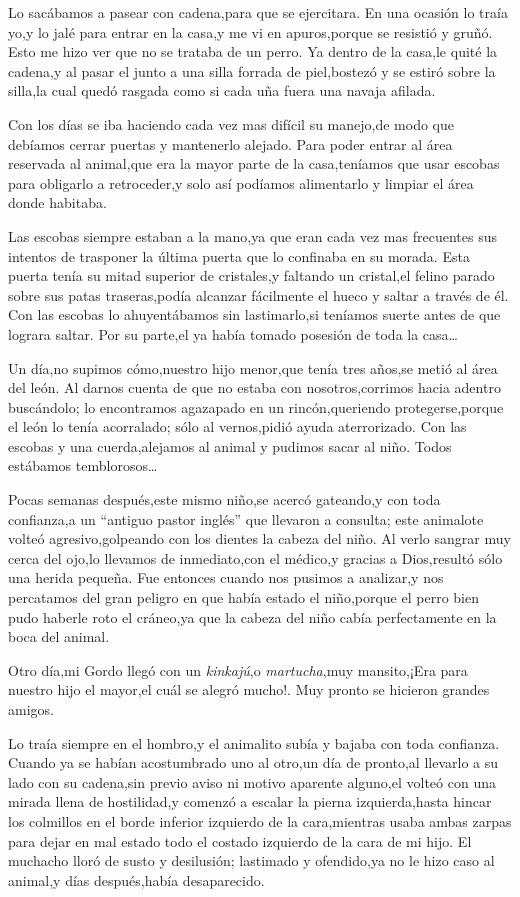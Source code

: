 \documentclass[letterpaper,12pt]{book}
\begin{document}
Lo sacábamos a pasear con cadena,para que se ejercitara. En una ocasión lo traía yo,y lo jalé para entrar en la casa,y me vi en apuros,porque se resistió y gruñó. Esto me hizo ver que no se trataba de un perro. Ya dentro de la casa,le quité la cadena,y al pasar el junto a una silla forrada de piel,bostezó y se estiró sobre la silla,la cual quedó rasgada como si cada uña fuera una navaja afilada.

Con los días se iba haciendo cada vez mas difícil su manejo,de modo que debíamos cerrar puertas y mantenerlo alejado. Para poder entrar al área reservada al animal,que era la mayor parte de la casa,teníamos que usar escobas para obligarlo a retroceder,y solo así podíamos alimentarlo y limpiar el área donde habitaba.

Las escobas siempre estaban a la mano,ya que eran cada vez mas frecuentes sus intentos de trasponer la última puerta que lo confinaba en su morada. Esta puerta tenía su mitad superior de cristales,y faltando un cristal,el felino parado sobre sus patas traseras,podía alcanzar fácilmente el hueco y saltar a través de él. Con las escobas lo ahuyentábamos sin lastimarlo,si teníamos suerte antes de que lograra saltar. Por su parte,el ya había tomado posesión de toda la casa\ldots

Un día,no supimos cómo,nuestro hijo menor,que tenía tres años,se metió al área del león. Al darnos cuenta de que no estaba con nosotros,corrimos hacia adentro buscándolo; lo encontramos agazapado en un rincón,queriendo protegerse,porque el león lo tenía acorralado; sólo al vernos,pidió ayuda aterrorizado. Con las escobas y una cuerda,alejamos al animal y pudimos sacar al niño. Todos estábamos temblorosos\ldots

Pocas semanas después,este mismo niño,se acercó gateando,y con toda confianza,a un ``antiguo pastor inglés'' que llevaron a consulta; este animalote volteó agresivo,golpeando con los dientes la cabeza del niño. Al verlo sangrar muy cerca del ojo,lo llevamos de inmediato,con el médico,y gracias a Dios,resultó sólo una herida pequeña. Fue entonces cuando nos pusimos a analizar,y nos percatamos del gran peligro en que había estado el niño,porque el perro bien pudo haberle roto el cráneo,ya que la cabeza del niño cabía perfectamente en la boca del animal.

Otro día,mi Gordo llegó con un {\it kinkajú},o {\it martucha},muy mansito,¡Era para nuestro hijo el mayor,el cuál se alegró mucho!. Muy pronto se hicieron grandes amigos.

Lo traía siempre en el hombro,y el animalito subía y bajaba con toda confianza. Cuando ya se habían acostumbrado uno al otro,un día de pronto,al llevarlo a su lado con su cadena,sin previo aviso ni motivo aparente alguno,el volteó con una mirada llena de hostilidad,y comenzó a escalar la pierna izquierda,hasta hincar los colmillos en el borde inferior izquierdo de la cara,mientras usaba ambas zarpas para dejar en mal estado todo el costado izquierdo de la cara de mi hijo. El muchacho lloró de susto y desilusión; lastimado y ofendido,ya no le hizo caso al animal,y días después,había desaparecido.
\end{document}
